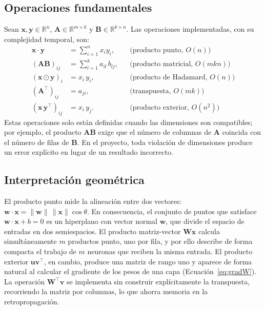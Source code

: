 \subsection{Operaciones fundamentales}
Sean $\mathbf{x},\mathbf{y}\in\mathbb{R}^{n}$, $\mathbf{A}\in\mathbb{R}^{m\times k}$ y $\mathbf{B}\in\mathbb{R}^{k\times n}$. Las operaciones implementadas, con su complejidad temporal, son:
\begin{align}
\mathbf{x}\cdot\mathbf{y} &= \sum_{i=1}^{n} x_i y_i, &&\text{(producto punto, } O(n)\text{)}\label{eq:dot}\\
(\mathbf{A}\mathbf{B})_{ij} &= \sum_{l=1}^{k} a_{il}\, b_{lj}, &&\text{(producto matricial, } O(mkn)\text{)}\label{eq:matmul}\\
(\mathbf{x}\odot\mathbf{y})_i &= x_i\, y_i, &&\text{(producto de Hadamard, } O(n)\text{)}\label{eq:hadamard}\\
(\mathbf{A}^{\top})_{ij} &= a_{ji}, &&\text{(transpuesta, } O(mk)\text{)}\label{eq:transpuesta}\\
(\mathbf{x}\,\mathbf{y}^{\top})_{ij} &= x_i\, y_j. &&\text{(producto exterior, } O(n^2)\text{)}\label{eq:outer}
\end{align}
Estas operaciones solo están definidas cuando las dimensiones son compatibles; por ejemplo, el producto $\mathbf{A}\mathbf{B}$ exige que el número de columnas de $\mathbf{A}$ coincida con el número de filas de $\mathbf{B}$. En el proyecto, toda violación de dimensiones produce un error explícito en lugar de un resultado incorrecto.

\subsection{Interpretación geométrica}
El producto punto mide la alineación entre dos vectores: $\mathbf{w}\cdot\mathbf{x} = \lVert\mathbf{w}\rVert\,\lVert\mathbf{x}\rVert\cos\theta$. En consecuencia, el conjunto de puntos que satisface $\mathbf{w}\cdot\mathbf{x} + b = 0$ es un hiperplano con vector normal $\mathbf{w}$, que divide el espacio de entradas en dos semiespacios. El producto matriz-vector $\mathbf{W}\mathbf{x}$ calcula simultáneamente $m$ productos punto, uno por fila, y por ello describe de forma compacta el trabajo de $m$ neuronas que reciben la misma entrada. El producto exterior $\mathbf{u}\mathbf{v}^{\top}$, en cambio, produce una matriz de rango uno y aparece de forma natural al calcular el gradiente de los pesos de una capa (Ecuación~\eqref{eq:gradW}). La operación $\mathbf{W}^{\top}\mathbf{v}$ se implementa sin construir explícitamente la transpuesta, recorriendo la matriz por columnas, lo que ahorra memoria en la retropropagación.

